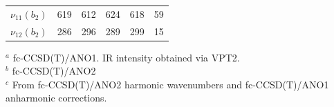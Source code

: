 \begin{table}[ht]
\begin{center}
\begin{tabular}{rrrrrr}
        $\nu_{11}(b_2)$ &  619  &  612 &  624 &  618 &  59  \\ %
        $\nu_{12}(b_2)$ &  286  &  296 &  289 &  299 &  15  \\ %
        \bottomrule
        \hline
    \end{tabular}
    \end{center}
    $^a$ fc-CCSD(T)/ANO1. IR intensity obtained via VPT2.\\
    $^b$ fc-CCSD(T)/ANO2\\
    $^c$ From fc-CCSD(T)/ANO2 harmonic wavenumbers and fc-CCSD(T)/ANO1 anharmonic corrections.

\end{table}

